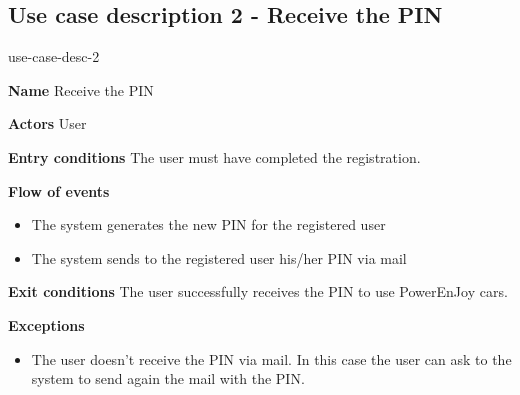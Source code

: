 \subsection{Use case description 2 - Receive the PIN}
\begin{labeling}{use-case-desc-2}
	\item[\textbf{Name}] Receive the PIN
	\item[\textbf{Actors}] User
	\item[\textbf{Entry conditions}] The user must have completed the registration.
	\item[\textbf{Flow of events}]
		\begin{itemize}
			\item[]
			\item The system generates the new PIN for the registered user
			\item The system sends to the registered user his/her PIN via mail
		\end{itemize}
	\item[\textbf{Exit conditions}] The user successfully receives the PIN to use PowerEnJoy cars.
	\item[\textbf{Exceptions}]
		\begin{itemize}
			\item[]
			\item The user doesn’t receive the PIN via mail. In this case the user can ask to the system to send again the mail with the PIN.
		\end{itemize}
\end{labeling}

